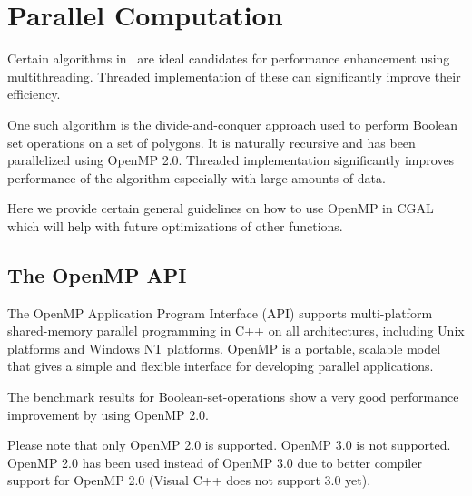 
\chapter{Parallel Computation\label{chap:parallel_computation}}

Certain algorithms in \cgal\ are ideal candidates for performance enhancement using multithreading. Threaded implementation of these can significantly improve their efficiency.

One such algorithm is the divide-and-conquer approach used to perform Boolean set operations on a set of polygons. It is naturally recursive and has been parallelized using OpenMP 2.0. Threaded implementation significantly improves performance of the algorithm especially with large amounts of data. 

Here we provide certain general guidelines on how to use OpenMP in CGAL which will help with future optimizations of other functions.

\section{The OpenMP API\label{sec:openmp}}

The OpenMP Application Program Interface (API) supports multi-platform shared-memory parallel programming in C++ on all architectures, including Unix platforms and Windows NT platforms. OpenMP is a portable, scalable model that gives a simple and flexible interface for developing parallel applications.

The benchmark results for Boolean-set-operations show a very good performance improvement by using OpenMP 2.0.

Please note that only OpenMP 2.0 is supported. OpenMP 3.0 is not supported. OpenMP 2.0 has been used instead of OpenMP 3.0 due to better compiler support for OpenMP 2.0 (Visual C++ does not support 3.0 yet). 

